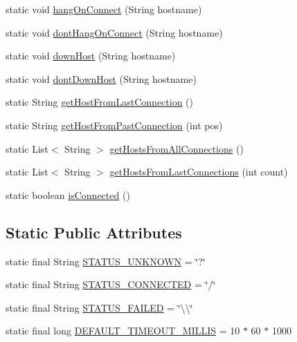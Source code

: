 \begin{DoxyCompactItemize}
static void \mbox{\hyperlink{classtestsuite_1_1_unreliable_socket_factory_a2266e4126f65454dae88fbb1d6a11130}{hang\+On\+Connect}} (String hostname)
\item 
static void \mbox{\hyperlink{classtestsuite_1_1_unreliable_socket_factory_aa2a6bb8fe4d3d6eebf4c8b0e083d230e}{dont\+Hang\+On\+Connect}} (String hostname)
\item 
static void \mbox{\hyperlink{classtestsuite_1_1_unreliable_socket_factory_a83758897cf0731bbee562f9c1b10a56b}{down\+Host}} (String hostname)
\item 
static void \mbox{\hyperlink{classtestsuite_1_1_unreliable_socket_factory_a3a64f904e1088a3f094e4f983e1a5161}{dont\+Down\+Host}} (String hostname)
\item 
static String \mbox{\hyperlink{classtestsuite_1_1_unreliable_socket_factory_a7a17f472892f980eb1e6fee265cf017d}{get\+Host\+From\+Last\+Connection}} ()
\item 
static String \mbox{\hyperlink{classtestsuite_1_1_unreliable_socket_factory_ad0be11be705ac21a4b946285562caf5b}{get\+Host\+From\+Past\+Connection}} (int pos)
\item 
static List$<$ String $>$ \mbox{\hyperlink{classtestsuite_1_1_unreliable_socket_factory_ab70a79c8c060bbd42135dcccac232a3e}{get\+Hosts\+From\+All\+Connections}} ()
\item 
static List$<$ String $>$ \mbox{\hyperlink{classtestsuite_1_1_unreliable_socket_factory_af95d260d8de35629bf4735fb9946006b}{get\+Hosts\+From\+Last\+Connections}} (int count)
\item 
static boolean \mbox{\hyperlink{classtestsuite_1_1_unreliable_socket_factory_a2a98c5f404403d475332e8b557560614}{is\+Connected}} ()
\end{DoxyCompactItemize}
\subsection*{Static Public Attributes}
\begin{DoxyCompactItemize}
\item 
static final String \mbox{\hyperlink{classtestsuite_1_1_unreliable_socket_factory_ab3f9a10e0c6fb5b7b50961c354cb168e}{S\+T\+A\+T\+U\+S\+\_\+\+U\+N\+K\+N\+O\+WN}} = \char`\"{}?\char`\"{}
\item 
static final String \mbox{\hyperlink{classtestsuite_1_1_unreliable_socket_factory_aba26420cbe3743803295fa8acdefac55}{S\+T\+A\+T\+U\+S\+\_\+\+C\+O\+N\+N\+E\+C\+T\+ED}} = \char`\"{}/\char`\"{}
\item 
static final String \mbox{\hyperlink{classtestsuite_1_1_unreliable_socket_factory_a012aaa326daab499cde10b634a549785}{S\+T\+A\+T\+U\+S\+\_\+\+F\+A\+I\+L\+ED}} = \char`\"{}\textbackslash{}\textbackslash{}\char`\"{}
\item 
static final long \mbox{\hyperlink{classtestsuite_1_1_unreliable_socket_factory_a04b724f9bcd5e359856361166c4ecf32}{D\+E\+F\+A\+U\+L\+T\+\_\+\+T\+I\+M\+E\+O\+U\+T\+\_\+\+M\+I\+L\+L\+IS}} = 10 $\ast$ 60 $\ast$ 1000
\end{DoxyCompactItemize}

